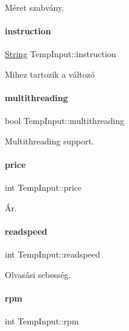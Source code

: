Méret szabvány. 

\mbox{\label{struct_temp_input_a693f4a5b4215b51144174287aecab527}} 
\paragraph{\texorpdfstring{instruction}{instruction}}
{\footnotesize\ttfamily \mbox{\hyperlink{class_string}{String}} Temp\+Input\+::instruction}



Mihez tartozik a változó 

\mbox{\label{struct_temp_input_ad8957d3af0ed714844abf3f37cbfc719}} 
\paragraph{\texorpdfstring{multithreading}{multithreading}}
{\footnotesize\ttfamily bool Temp\+Input\+::multithreading}



Multithreading support. 

\mbox{\label{struct_temp_input_a6d049ee814f00b43e1d951317261e357}} 
\paragraph{\texorpdfstring{price}{price}}
{\footnotesize\ttfamily int Temp\+Input\+::price}



Ár. 

\mbox{\label{struct_temp_input_a75c5e55813802a9d6af6818de81e6001}} 
\paragraph{\texorpdfstring{readspeed}{readspeed}}
{\footnotesize\ttfamily int Temp\+Input\+::readspeed}



Olvasási sebesség. 

\mbox{\label{struct_temp_input_a661104db14326156bbb2ffa5a7c6f468}} 
\paragraph{\texorpdfstring{rpm}{rpm}}
{\footnotesize\ttfamily int Temp\+Input\+::rpm}



